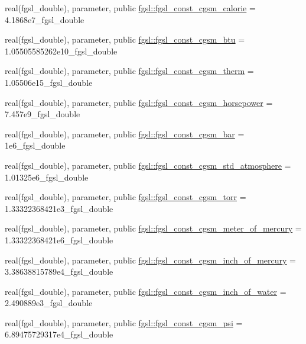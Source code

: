 \begin{DoxyCompactItemize}
\item 
real(fgsl\+\_\+double), parameter, public \hyperlink{namespacefgsl_a82882b4ac09d9b5f5cd25cff0daa2119}{fgsl\+::fgsl\+\_\+const\+\_\+cgsm\+\_\+calorie} = 4.\+1868e7\+\_\+fgsl\+\_\+double
\item 
real(fgsl\+\_\+double), parameter, public \hyperlink{namespacefgsl_a01479e6b5bfdbc02efb80e985ca837a6}{fgsl\+::fgsl\+\_\+const\+\_\+cgsm\+\_\+btu} = 1.\+05505585262e10\+\_\+fgsl\+\_\+double
\item 
real(fgsl\+\_\+double), parameter, public \hyperlink{namespacefgsl_a3a73d93cd550287bba936f1fe898b44b}{fgsl\+::fgsl\+\_\+const\+\_\+cgsm\+\_\+therm} = 1.\+05506e15\+\_\+fgsl\+\_\+double
\item 
real(fgsl\+\_\+double), parameter, public \hyperlink{namespacefgsl_a42cd4b78f557f4774c2542bb74f48dfb}{fgsl\+::fgsl\+\_\+const\+\_\+cgsm\+\_\+horsepower} = 7.\+457e9\+\_\+fgsl\+\_\+double
\item 
real(fgsl\+\_\+double), parameter, public \hyperlink{namespacefgsl_a324807e6ca282345460f8918fc39f07f}{fgsl\+::fgsl\+\_\+const\+\_\+cgsm\+\_\+bar} = 1e6\+\_\+fgsl\+\_\+double
\item 
real(fgsl\+\_\+double), parameter, public \hyperlink{namespacefgsl_a3da30a3dd34b8f19a5e653e57f41f360}{fgsl\+::fgsl\+\_\+const\+\_\+cgsm\+\_\+std\+\_\+atmosphere} = 1.\+01325e6\+\_\+fgsl\+\_\+double
\item 
real(fgsl\+\_\+double), parameter, public \hyperlink{namespacefgsl_a94ff1d0989beeed6065313b2a63530cb}{fgsl\+::fgsl\+\_\+const\+\_\+cgsm\+\_\+torr} = 1.\+33322368421e3\+\_\+fgsl\+\_\+double
\item 
real(fgsl\+\_\+double), parameter, public \hyperlink{namespacefgsl_aa8fef1711fbb6768c4d9f7061e85b117}{fgsl\+::fgsl\+\_\+const\+\_\+cgsm\+\_\+meter\+\_\+of\+\_\+mercury} = 1.\+33322368421e6\+\_\+fgsl\+\_\+double
\item 
real(fgsl\+\_\+double), parameter, public \hyperlink{namespacefgsl_a3cedc29e68dc7bfeb7a43c07d1496c6e}{fgsl\+::fgsl\+\_\+const\+\_\+cgsm\+\_\+inch\+\_\+of\+\_\+mercury} = 3.\+38638815789e4\+\_\+fgsl\+\_\+double
\item 
real(fgsl\+\_\+double), parameter, public \hyperlink{namespacefgsl_ae3e9d91a0883033afa45f2237810a306}{fgsl\+::fgsl\+\_\+const\+\_\+cgsm\+\_\+inch\+\_\+of\+\_\+water} = 2.\+490889e3\+\_\+fgsl\+\_\+double
\item 
real(fgsl\+\_\+double), parameter, public \hyperlink{namespacefgsl_adbc0f817c0f6ab5ff3cb517430c2a28f}{fgsl\+::fgsl\+\_\+const\+\_\+cgsm\+\_\+psi} = 6.\+89475729317e4\+\_\+fgsl\+\_\+double

\end{DoxyCompactItemize}
